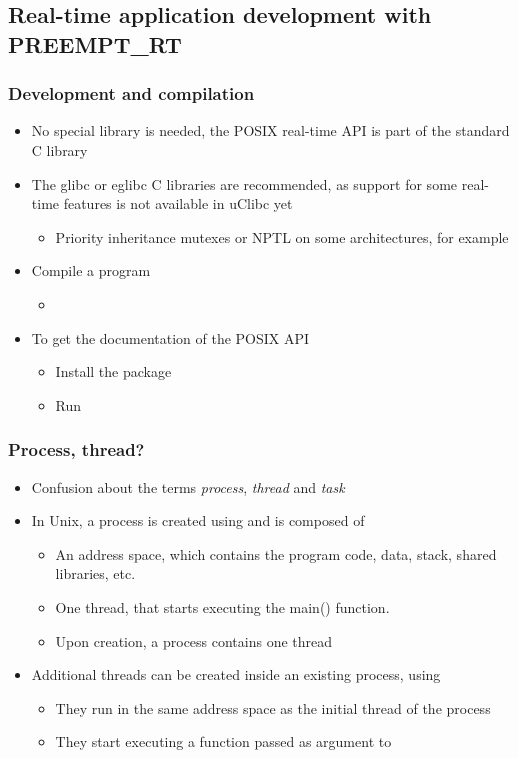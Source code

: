 \subsection{Real-time application development with PREEMPT\_RT}

\begin{frame}
  \frametitle{Development and compilation}
  \begin{itemize}
  \item No special library is needed, the POSIX real-time API is part
    of the standard C library
  \item The glibc or eglibc C libraries are recommended, as support
    for some real-time features is not available in uClibc yet
    \begin{itemize}
    \item Priority inheritance mutexes or NPTL on some architectures,
      for example
    \end{itemize}
  \item Compile a program
    \begin{itemize}
    \item {}
    \end{itemize}
  \item To get the documentation of the POSIX API
    \begin{itemize}
    \item Install the  package
    \item Run 
    \end{itemize}
  \end{itemize}
\end{frame}

\begin{frame}
  \frametitle{Process, thread?}
  \begin{itemize}
  \item Confusion about the terms {\em process}, {\em thread} and {\em task}
  \item In Unix, a process is created using  and is composed of
    \begin{itemize}
    \item An address space, which contains the program code, data, stack, shared
      libraries, etc.
    \item One thread, that starts executing the main() function.
    \item Upon creation, a process contains one thread
    \end{itemize}
  \item Additional threads can be created inside an existing process, using
    \begin{itemize}
    \item They run in the same address space as the initial thread of
      the process
    \item They start executing a function passed as argument to
    \end{itemize}
  \end{itemize}
\end{frame}

